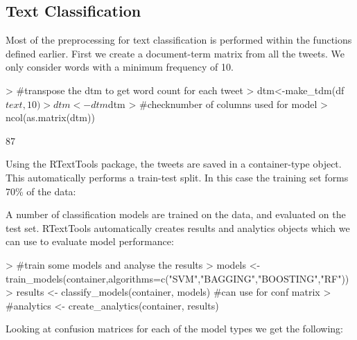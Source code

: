 \documentclass[10pt]{article}
\begin{document}
\subsection{Text Classification}
Most of the preprocessing for text classification is performed within the functions defined earlier. First we create a document-term matrix from all the tweets. We only consider words with a minimum frequency of 10. 

\begin{Schunk}
\begin{Sinput}
> #transpose the dtm to get word count for each tweet
> dtm<-make_tdm(df$text,10)
> dtm<-dtm$dtm
> #checknumber of columns used for model
> ncol(as.matrix(dtm))
\end{Sinput}
\begin{Soutput}
[1] 87
\end{Soutput}
\end{Schunk}
Using the RTextTools package, the tweets are saved in a container-type object. This automatically performs a train-test split. In this case the training set forms 70\% of the data:
\begin{Schunk}
\end{Schunk}
A number of classification models are trained on the data, and evaluated on the test set. RTextTools automatically creates results and analytics objects which we can use to evaluate model performance:
\begin{Schunk}
\begin{Sinput}
> #train some models and analyse the results
> models <- train_models(container,algorithms=c("SVM","BAGGING","BOOSTING","RF"))
> results <- classify_models(container, models) #can use for conf matrix
> #analytics <- create_analytics(container, results)
\end{Sinput}
\end{Schunk}
Looking at confusion matrices for each of the model types we get the following:
\end{document}
